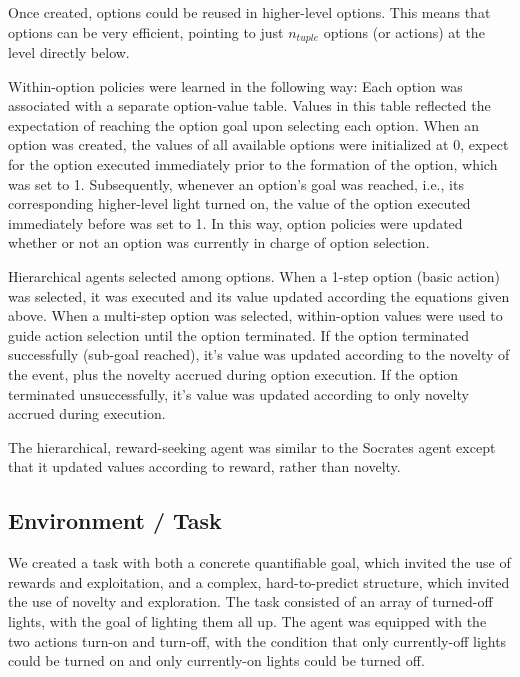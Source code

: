 \documentclass{article}
\begin{document}
Once created, options could be reused in higher-level options. This means that options can be very efficient, pointing to just $n_{tuple}$ options (or actions) at the level directly below.

Within-option policies were learned in the following way: Each option was associated with a separate option-value table. Values in this table reflected the expectation of reaching the option goal upon selecting each option. When an option was created, the values of all available options were initialized at 0, expect for the option executed immediately prior to the formation of the option, which was set to 1. Subsequently, whenever an option's goal was reached, i.e., its corresponding higher-level light turned on, the value of the option executed immediately before was set to 1. In this way, option policies were updated whether or not an option was currently in charge of option selection. 

Hierarchical agents selected among options. When a 1-step option (basic action) was selected, it was executed and its value updated according the equations given above. When a multi-step option was selected, within-option values were used to guide action selection until the option terminated. If the option terminated successfully (sub-goal reached), it's value was updated according to the novelty of the event, plus the novelty accrued during option execution. If the option terminated unsuccessfully, it's value was updated according to only novelty accrued during execution. 

The hierarchical, reward-seeking agent was similar to the Socrates agent except that it updated values according to reward, rather than novelty.


\subsection{Environment / Task}

We created a task with both a concrete quantifiable goal, which invited the use of rewards and exploitation, and a complex, hard-to-predict structure, which invited the use of novelty and exploration. The task consisted of an array of turned-off lights, with the goal of lighting them all up. The agent was equipped with the two actions turn-on and turn-off, with the condition that only currently-off lights could be turned on and only currently-on lights could be turned off.
\end{document}

